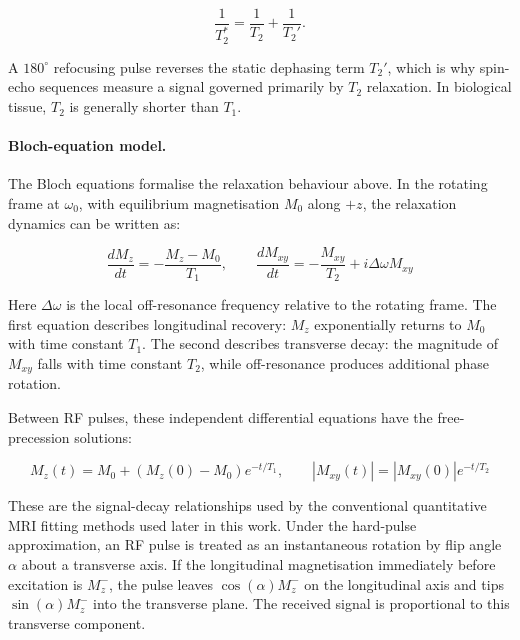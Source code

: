 \begin{equation}
    \frac{1}{T_2^*} = \frac{1}{T_2} + \frac{1}{T_2'}.
\end{equation}

A \(180^\circ\) refocusing pulse reverses the static dephasing term
\(T_2'\), which is why spin-echo sequences measure a signal governed
primarily by \(T_2\) relaxation. In biological tissue, \(T_2\) is generally
shorter than \(T_1\).\cite{MRI_Physics_Primer:12}

\paragraph{Bloch-equation model.}
The Bloch equations formalise the relaxation behaviour above. In the
rotating frame at \(\omega_0\), with equilibrium magnetisation \(M_0\)
along \(+z\), the relaxation dynamics can be written as:

\begin{equation}
    \frac{dM_z}{dt} = -\frac{M_z - M_0}{T_1},
    \qquad
    \frac{dM_{xy}}{dt} =
    -\frac{M_{xy}}{T_2} + i\Delta\omega M_{xy}
\end{equation}

Here $\Delta\omega$ is the local off-resonance frequency relative to the
rotating frame. The first equation describes longitudinal recovery:
$M_z$ exponentially returns to $M_0$ with time constant $T_1$. The second
describes transverse decay: the magnitude of $M_{xy}$ falls with time
constant $T_2$, while off-resonance produces additional phase rotation.

Between RF pulses, these independent differential equations have the free-precession
solutions:

\begin{equation}
    M_z(t) = M_0 + \left(M_z(0) - M_0\right)e^{-t/T_1},
    \qquad
    \left|M_{xy}(t)\right| =
    \left|M_{xy}(0)\right|e^{-t/T_2}
\end{equation}

These are the signal-decay relationships used by the conventional quantitative 
MRI fitting methods used later in this work. Under the hard-pulse
approximation, an RF pulse is treated as an instantaneous rotation by flip
angle $\alpha$ about a transverse axis. If the longitudinal magnetisation
immediately before excitation is $M_z^-$, the pulse leaves
$\cos(\alpha)M_z^-$ on the longitudinal axis and tips
$\sin(\alpha)M_z^-$ into the transverse plane. The received signal is 
proportional to this transverse component.

